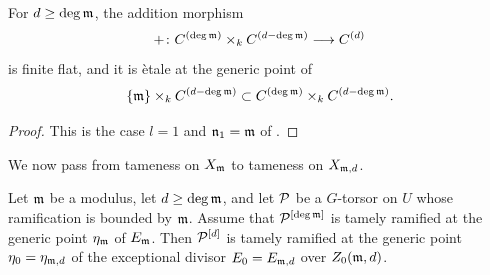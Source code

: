 \begin{cor}\label{cor:etale_at_generic_point}
For $d\geq\deg\mathfrak{m}$, the addition morphism
\[
+\colon C^{(\deg\mathfrak{m})}\times_k C^{(d-\deg\mathfrak{m})}\longrightarrow C^{(d)}
\]
is finite flat, and it is \`etale at the generic point of
\[
\{\mathfrak{m}\}\times_k C^{(d-\deg\mathfrak{m})}
   \subset C^{(\deg\mathfrak{m})}\times_k C^{(d-\deg\mathfrak{m})}.
\]
\end{cor}
\begin{proof}
This is the case $l=1$ and $\mathfrak{n}_1=\mathfrak{m}$ of .
\end{proof}

We now pass from tameness on $X_{\mathfrak{m}}$ to tameness on $X_{\mathfrak{m},d}$.

\begin{cor}\label{cor:tame-ramification-symmetric-product}
Let $\mathfrak{m}$ be a modulus, let $d\geq\deg\mathfrak{m}$, and let $\mathcal{P}$ be a
$G$-torsor on $U$ whose ramification is bounded by $\mathfrak{m}$. Assume that
$\mathcal{P}^{[\deg\mathfrak{m}]}$ is tamely ramified at the generic point
$\eta_{\mathfrak{m}}$ of $E_{\mathfrak{m}}$. Then $\mathcal{P}^{[d]}$ is tamely ramified at
the generic point $\eta_0=\eta_{\mathfrak{m},d}$ of the exceptional divisor
$E_0=E_{\mathfrak{m},d}$ over $Z_0(\mathfrak{m},d)$.
\end{cor}
